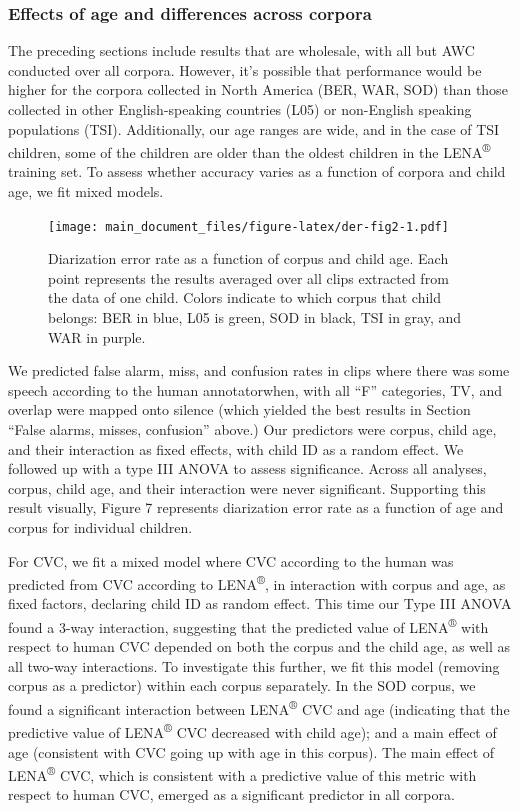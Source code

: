 \documentclass[english,floatsintext,man]{apa6}
\begin{document}
\subsubsection{Effects of age and differences across
corpora}\label{effects-of-age-and-differences-across-corpora}

The preceding sections include results that are wholesale, with all but
AWC conducted over all corpora. However, it's possible that performance
would be higher for the corpora collected in North America (BER, WAR,
SOD) than those collected in other English-speaking countries (L05) or
non-English speaking populations (TSI). Additionally, our age ranges are
wide, and in the case of TSI children, some of the children are older
than the oldest children in the LENA\textsuperscript{®} training set. To
assess whether accuracy varies as a function of corpora and child age,
we fit mixed models.

\begin{figure}
\centering
\texttt{[image: main\_document\_files/figure-latex/der-fig2-1.pdf]}
\caption{\label{fig:der-fig2}Diarization error rate as a function of corpus
and child age. Each point represents the results averaged over all clips
extracted from the data of one child. Colors indicate to which corpus
that child belongs: BER in blue, L05 is green, SOD in black, TSI in
gray, and WAR in purple.}
\end{figure}

We predicted false alarm, miss, and confusion rates in clips where there
was some speech according to the human annotatorwhen, with all
\enquote{F} categories, TV, and overlap were mapped onto silence (which
yielded the best results in Section \enquote{False alarms, misses,
confusion} above.) Our predictors were corpus, child age, and their
interaction as fixed effects, with child ID as a random effect. We
followed up with a type III ANOVA to assess significance. Across all
analyses, corpus, child age, and their interaction were never
significant. Supporting this result visually, Figure 7 represents
diarization error rate as a function of age and corpus for individual
children.

For CVC, we fit a mixed model where CVC according to the human was
predicted from CVC according to LENA\textsuperscript{®}, in interaction
with corpus and age, as fixed factors, declaring child ID as random
effect. This time our Type III ANOVA found a 3-way interaction,
suggesting that the predicted value of LENA\textsuperscript{®} with
respect to human CVC depended on both the corpus and the child age, as
well as all two-way interactions. To investigate this further, we fit
this model (removing corpus as a predictor) within each corpus
separately. In the SOD corpus, we found a significant interaction
between LENA\textsuperscript{®} CVC and age (indicating that the
predictive value of LENA\textsuperscript{®} CVC decreased with child
age); and a main effect of age (consistent with CVC going up with age in
this corpus). The main effect of LENA\textsuperscript{®} CVC, which is
consistent with a predictive value of this metric with respect to human
CVC, emerged as a significant predictor in all corpora.
\end{document}
